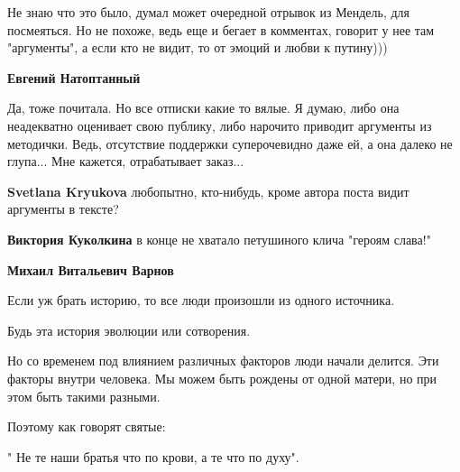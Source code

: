 \begin{itemize}
\begin{itemize}
Не знаю что это было, думал может очередной отрывок из Мендель, для посмеяться.
Но не похоже, ведь еще и бегает в комментах, говорит у нее там "аргументы", а
если кто не видит, то от эмоций и любви к путину)))

 
\textbf{Евгений Натоптанный} 

Да, тоже почитала. Но все отписки какие то вялые. Я думаю, либо она неадекватно
оценивает свою публику, либо нарочито приводит аргументы из методички. Ведь,
отсутствие поддержки суперочевидно даже ей, а она далеко не глупа... Мне
кажется, отрабатывает заказ...

 
\textbf{Svetlana Kryukova} любопытно, кто-нибудь, кроме автора поста видит аргументы в тексте?

 
\textbf{Виктория Куколкина} в конце не хватало петушиного клича "героям слава!"

 
\textbf{Михаил Витальевич Варнов}

Если уж брать историю, то все люди произошли из одного источника.

Будь эта история эволюции или сотворения.

Но со временем под влиянием различных факторов люди начали делится. Эти факторы
внутри человека. Мы можем быть рождены от одной матери, но при этом быть такими
разными.

Поэтому как говорят святые:

" Не те наши братья что по крови, а те что по духу".


\end{itemize}
\end{itemize}
